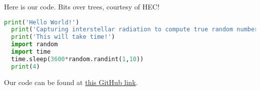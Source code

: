 Here is our code. Bits over trees, courtesy of HEC!

\begin{lstlisting}[language=python, showstringspaces=false]
  print('Hello World!')
  print('Capturing interstellar radiation to compute true random number.')
  print('This will take time!')
  import random
  import time
  time.sleep(3600*random.randint(1,10))
  print(4)
\end{lstlisting}

Our code can be found at \href{}{this GitHub link}.